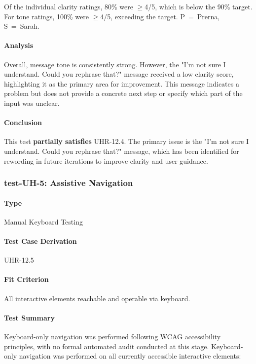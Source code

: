 \documentclass[12pt, titlepage]{article}
\begin{document}
Of the individual clarity ratings, 80\% were $\geq$4/5, which is below the 90\% target. For tone ratings, 100\% were $\geq$4/5, exceeding the target. P~=~Prerna, S~=~Sarah.

\paragraph{Analysis}
Overall, message tone is consistently strong. However, the "I'm not sure I understand. Could you rephrase that?" message received a low clarity score, highlighting it as the primary area for improvement. This message indicates a problem but does not provide a concrete next step or specify which part of the input was unclear.

\paragraph{Conclusion}
This test \textbf{partially satisfies} UHR-12.4. The primary issue is the "I'm not sure I understand. Could you rephrase that?" message, which has been identified for rewording in future iterations to improve clarity and user guidance.

\subsubsection{test-UH-5: Assistive Navigation}

\paragraph{Type} Manual Keyboard Testing

\paragraph{Test Case Derivation} UHR-12.5

\paragraph{Fit Criterion}
All interactive elements reachable and operable via keyboard. 

\paragraph{Test Summary}
Keyboard-only navigation was performed following WCAG accessibility principles, with no formal automated audit conducted at this stage.
Keyboard-only navigation was performed on all currently accessible interactive elements:
\end{document}
